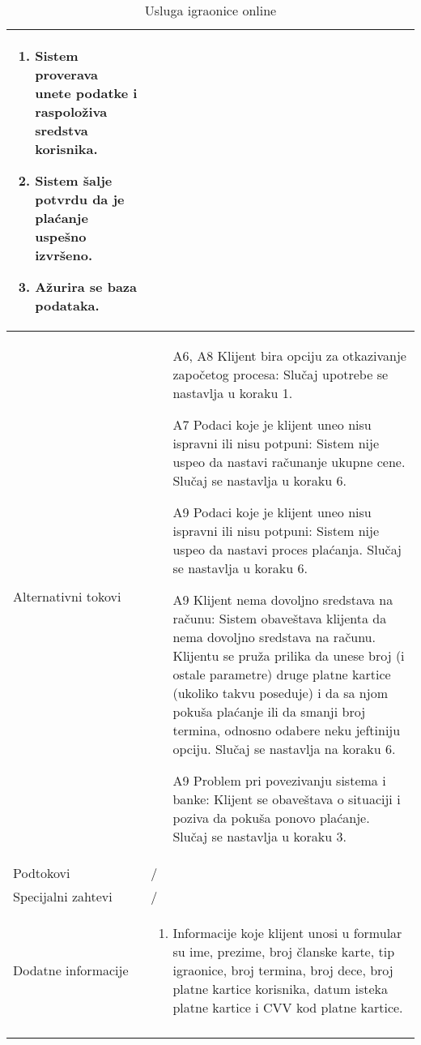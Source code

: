 \documentclass[../../main.tex]{subfiles}
\begin{document}
\begin{longtable}{| p{} | p{} |}
\begin{enumerate}
        \item Sistem proverava unete podatke i raspoloživa sredstva korisnika.
        \item Sistem šalje potvrdu da je plaćanje uspešno izvršeno.
        \item Ažurira se baza podataka.
    \end{enumerate}\\
\hline
    Alternativni tokovi & 
    \begin{itemize}
        \item[A6, A8] Klijent bira opciju za otkazivanje započetog procesa: Slučaj upotrebe se nastavlja u koraku 1.
        \item[A7] Podaci koje je klijent uneo nisu ispravni ili nisu potpuni: Sistem nije uspeo da nastavi računanje ukupne cene. Slučaj se nastavlja u koraku 6.
        \item[A9] Podaci koje je klijent uneo nisu ispravni ili nisu potpuni: Sistem nije uspeo da nastavi proces plaćanja. Slučaj se nastavlja u koraku 6.
        \item[A9] Klijent nema dovoljno sredstava na računu: Sistem obaveštava klijenta da nema dovoljno sredstava na računu. Klijentu se pruža prilika da unese broj (i ostale parametre) druge platne kartice (ukoliko takvu poseduje) i da sa njom pokuša plaćanje ili da smanji broj termina, odnosno odabere neku jeftiniju opciju. Slučaj se nastavlja na koraku 6.
        \item[A9] Problem pri povezivanju sistema i banke: Klijent se obaveštava o situaciji i poziva da pokuša ponovo plaćanje. Slučaj se nastavlja u koraku 3.
    \end{itemize} \\
\hline
    Podtokovi & /\\
\hline
    Specijalni zahtevi & /\\
\hline
    Dodatne informacije &
    \begin{enumerate}
        \item Informacije koje klijent unosi u formular su ime, prezime, broj članske karte, tip igraonice, broj termina, broj dece, broj platne kartice korisnika, datum isteka platne kartice i CVV kod platne kartice.
    \end{enumerate}\\
\hline
\caption{Usluga igraonice online}
\end{longtable}
\end{document}
